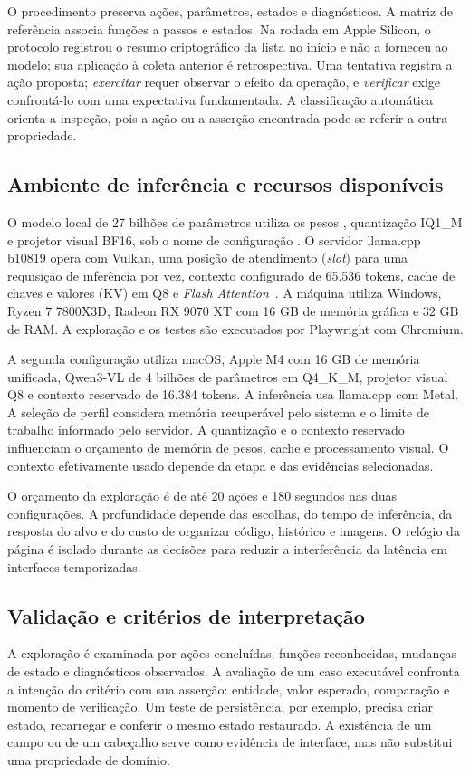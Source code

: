 \documentclass[12pt]{article}
\begin{document}
O procedimento preserva ações, parâmetros, estados e diagnósticos. A matriz de referência associa funções a passos e estados. Na rodada em Apple Silicon, o protocolo registrou o resumo criptográfico da lista no início e não a forneceu ao modelo; sua aplicação à coleta anterior é retrospectiva. Uma tentativa registra a ação proposta; \textit{exercitar} requer observar o efeito da operação, e \textit{verificar} exige confrontá-lo com uma expectativa fundamentada. A classificação automática orienta a inspeção, pois a ação ou a asserção encontrada pode se referir a outra propriedade.

\subsection{Ambiente de inferência e recursos disponíveis}
O modelo local de 27 bilhões de parâmetros utiliza os pesos , quantização IQ1\_M e projetor visual BF16, sob o nome de configuração . O servidor llama.cpp b10819 opera com Vulkan, uma posição de atendimento (\textit{slot}) para uma requisição de inferência por vez, contexto configurado de 65.536 tokens, cache de chaves e valores (KV) em Q8 e \textit{Flash Attention}~\cite{ggml2026llama}. A máquina utiliza Windows, Ryzen 7 7800X3D, Radeon RX 9070 XT com 16 GB de memória gráfica e 32 GB de RAM. A exploração e os testes são executados por Playwright com Chromium.

A segunda configuração utiliza macOS, Apple M4 com 16 GB de memória unificada, Qwen3-VL de 4 bilhões de parâmetros em Q4\_K\_M, projetor visual Q8 e contexto reservado de 16.384 tokens. A inferência usa llama.cpp com Metal. A seleção de perfil considera memória recuperável pelo sistema e o limite de trabalho informado pelo servidor. A quantização e o contexto reservado influenciam o orçamento de memória de pesos, cache e processamento visual. O contexto efetivamente usado depende da etapa e das evidências selecionadas.

O orçamento da exploração é de até 20 ações e 180 segundos nas duas configurações. A profundidade depende das escolhas, do tempo de inferência, da resposta do alvo e do custo de organizar código, histórico e imagens. O relógio da página é isolado durante as decisões para reduzir a interferência da latência em interfaces temporizadas.

\subsection{Validação e critérios de interpretação}
A exploração é examinada por ações concluídas, funções reconhecidas, mudanças de estado e diagnósticos observados. A avaliação de um caso executável confronta a intenção do critério com sua asserção: entidade, valor esperado, comparação e momento de verificação. Um teste de persistência, por exemplo, precisa criar estado, recarregar e conferir o mesmo estado restaurado. A existência de um campo ou de um cabeçalho serve como evidência de interface, mas não substitui uma propriedade de domínio.
\end{document}
